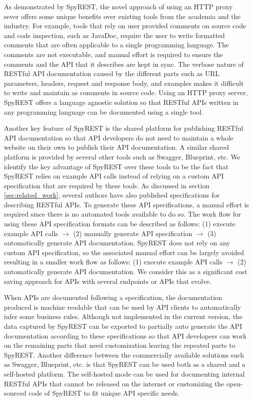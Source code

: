 \documentclass[conference]{IEEEtran}
\begin{document}
As demonstrated by SpyREST, the novel approach of using an HTTP proxy sever offers some unique benefits over existing tools from the academia and the industry. For example, tools that rely on user provided comments on source code and code inspection, such as JavaDoc, require the user to write formatted comments that are often applicable to a single programming language. The comments are not executable, and manual effort is required to ensure the comments and the API that it describes are kept in sync. The verbose nature of RESTful API documentation caused by the different parts such as URL parameters, headers, request and response body, and examples makes it difficult to write and maintain as comments in source code. Using an HTTP proxy server, SpyREST offers a language agnostic solution so that RESTful APIs written in any programming language can be documented using a single tool.

Another key feature of SpyREST is the shared platform for publishing RESTful API documentation so that API developers do not need to maintain a whole website on their own to publish their API documentation. A similar shared platform is provided by several other tools such as Swagger, Blueprint, etc. We identify the key advantage of SpyREST over these tools to be the fact that SpyREST relies on example API calls instead of relying on a custom API specification that are required by these tools. As discussed in section \ref{sec:related_work}, several authors have also published specifications for describing RESTful APIs. To generate these API specifications, a manual effort is required since there is no automated tools available to do so. The work flow for using these API specification formats can be described as follows: (1) execute example API calls $\longrightarrow$ (2) manually generate API specification $\longrightarrow$ (3) automatically generate API documentation. SpyREST does not rely on any custom API specification, so the associated manual effort can be largely avoided resulting in a smaller work flow as follows: (1) execute example API calls $\longrightarrow$ (2) automatically generate API documentation. We consider this as a significant cost saving approach for APIs with several endpoints or APIs that evolve.

When APIs are documented following a specification, the documentation produced is machine readable that can be used by API clients to automatically infer some business rules. Although not implemented in the current version, the data captured by SpyREST can be exported to partially auto generate the API documentation according to these specifications so that API developers can work on the remaining parts that need customization leaving the repeated parts to SpyREST. Another difference between the commercially available solutions such as Swagger, Blueprint, etc. is that SpyREST can be used both as a shared and a self-hosted platform. The self-hosted mode can be used for documenting internal RESTful APIs that cannot be released on the internet or customizing the open-sourced code of SpyREST to fit unique API specific needs.
\end{document}
